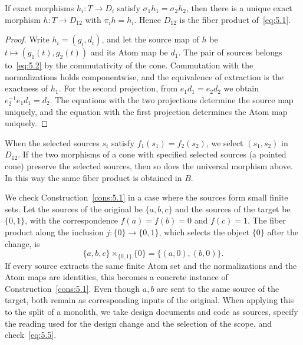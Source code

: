 \begin{proposition}\label{prop:5.2}

If exact morphisms $h_i:T\to D_i$ satisfy $\sigma_1h_1=\sigma_2h_2$, then there is a unique
exact morphism $h:T\to D_{12}$ with $\pi_i h=h_i$. Hence $D_{12}$ is the fiber product
of~\eqref{eq:5.1}.

\end{proposition}

\begin{proof}

Write $h_i=(g_i,d_i)$, and let the source map of $h$ be $t\mapsto(g_1(t),g_2(t))$ and its
Atom map be $d_1$. The pair of sources belongs to~\eqref{eq:5.2} by the commutativity of the
cone. Commutation with the normalizations holds componentwise, and the equivalence of
extraction is the exactness of $h_1$. For the second projection, from $e_1d_1=e_2d_2$ we
obtain $e_2^{-1}e_1d_1=d_2$. The equations with the two projections determine the source map
uniquely, and the equation with the first projection determines the Atom map uniquely.

\end{proof}

When the selected sources $s_i$ satisfy $f_1(s_1)=f_2(s_2)$, we select $(s_1,s_2)$ in
$D_{12}$. If the two morphisms of a cone with specified selected sources (a pointed cone)
preserve the selected sources, then so does the universal morphism above. In this way the
same fiber product is obtained in $B$.

\begin{example}\label{ex:5.3}

We check Construction~\ref{cons:5.1} in a case where the sources form small finite sets. Let
the sources of the original be $\{a,b,c\}$ and the sources of the target be $\{0,1\}$, with
the correspondence $f(a)=f(b)=0$ and $f(c)=1$. The fiber product along the inclusion
$j:\{0\}\to\{0,1\}$, which selects the object $\{0\}$ after the change, is
\begin{equation*}
\{a,b,c\}\times_{\{0,1\}}\{0\}
=\{(a,0),(b,0)\}.
\tag{5.6}\label{eq:5.6}
\end{equation*}
If every source extracts the same finite Atom set and the normalizations and the Atom maps
are identities, this becomes a concrete instance of Construction~\ref{cons:5.1}. Even though
$a,b$ are sent to the same source of the target, both remain as corresponding inputs of the
original. When applying this to the split of a monolith, we take design documents and code as
sources, specify the reading used for the design change and the selection of the scope, and
check~\eqref{eq:5.5}.

\end{example}

